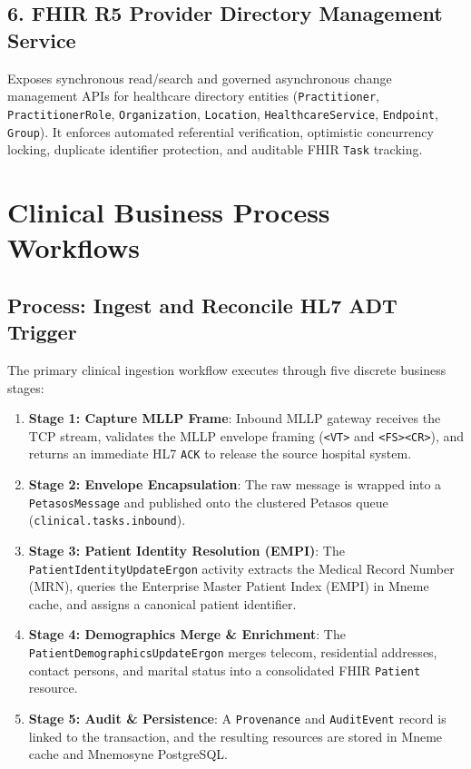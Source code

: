 \subsection{6. FHIR R5 Provider Directory Management Service}
Exposes synchronous read/search and governed asynchronous change management APIs for healthcare directory entities (\texttt{Practitioner}, \texttt{PractitionerRole}, \texttt{Organization}, \texttt{Location}, \texttt{HealthcareService}, \texttt{Endpoint}, \texttt{Group}). It enforces automated referential verification, optimistic concurrency locking, duplicate identifier protection, and auditable FHIR \texttt{Task} tracking.

\section{Clinical Business Process Workflows}

\subsection{Process: Ingest and Reconcile HL7 ADT Trigger}
The primary clinical ingestion workflow executes through five discrete business stages:
\begin{enumerate}
    \item \textbf{Stage 1: Capture MLLP Frame}: Inbound MLLP gateway receives the TCP stream, validates the MLLP envelope framing (\texttt{<VT>} and \texttt{<FS><CR>}), and returns an immediate HL7 \texttt{ACK} to release the source hospital system.
    \item \textbf{Stage 2: Envelope Encapsulation}: The raw message is wrapped into a \texttt{PetasosMessage} and published onto the clustered Petasos queue (\texttt{clinical.tasks.inbound}).
    \item \textbf{Stage 3: Patient Identity Resolution (EMPI)}: The \texttt{PatientIdentityUpdateErgon} activity extracts the Medical Record Number (MRN), queries the Enterprise Master Patient Index (EMPI) in Mneme cache, and assigns a canonical patient identifier.
    \item \textbf{Stage 4: Demographics Merge \& Enrichment}: The \texttt{PatientDemographicsUpdateErgon} merges telecom, residential addresses, contact persons, and marital status into a consolidated FHIR \texttt{Patient} resource.
    \item \textbf{Stage 5: Audit \& Persistence}: A \texttt{Provenance} and \texttt{AuditEvent} record is linked to the transaction, and the resulting resources are stored in Mneme cache and Mnemosyne PostgreSQL.
\end{enumerate}

